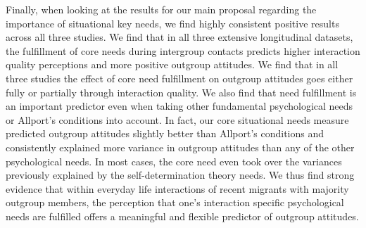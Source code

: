 \documentclass[man, 12pt, a4paper, mask]{apa7}
\theoremstyle{break}
\theoremstyle{plain}
\begin{document}
Finally, when looking at the results for our main proposal regarding the importance of situational key needs, we find highly consistent positive results across all three studies. We find that in all three extensive longitudinal datasets, the fulfillment of core needs during intergroup contacts predicts higher interaction quality perceptions and more positive outgroup attitudes. We find that in all three studies the effect of core need fulfillment on outgroup attitudes goes either fully or partially through interaction quality. We also find that need fulfillment is an important predictor even when taking other fundamental psychological needs or Allport's conditions into account. In fact, our core situational needs measure predicted outgroup attitudes slightly better than Allport's conditions and consistently explained more variance in outgroup attitudes than any of the other psychological needs. In most cases, the core need even took over the variances previously explained by the self-determination theory needs. We thus find strong evidence that within everyday life interactions of recent migrants with majority outgroup members, the perception that one's interaction specific psychological needs are fulfilled offers a meaningful and flexible predictor of outgroup attitudes.
\end{document}
